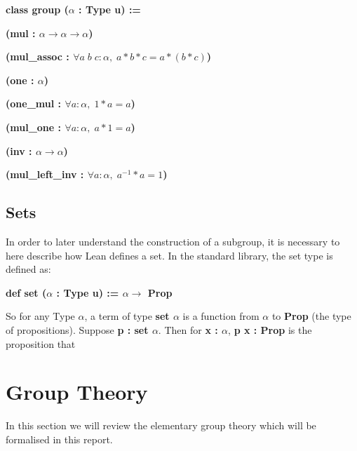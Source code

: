 \documentclass[runningheads,a4paper]{llncs}
\renewcommand{\a}{\alpha}
\renewcommand{\-}{\setminus}
\begin{document}
\vspace{2 mm}
\hspace{4 em}\textbf{class group ($\a$ : Type u) := }

\hspace{6 em}\textbf{(mul : $\a \to \a \to \a$)}

\hspace{6 em}\textbf{(mul\_assoc : $\forall a\; b\; c : \a,\; a * b * c = a * (b * c)$)}

\hspace{6 em}\textbf{(one : $\a$)}

\hspace{6 em}\textbf{(one\_mul : $\forall a : \a,\; 1 * a = a$)}

\hspace{6 em}\textbf{(mul\_one : $\forall a : \a,\; a * 1 = a$)}

\hspace{6 em}\textbf{(inv : $\a \to \a$)}

\hspace{6 em}\textbf{(mul\_left\_inv : $\forall a : \a,\; a^{-1} * a = 1$)}
\vspace{2 mm}

\subsection{Sets}

In order to later understand the construction of a subgroup, it is necessary to here describe how Lean defines a set. In the standard library, the set type is defined as:

\vspace{2 mm}
\hspace{4 em}\textbf{def set ($\a$ : Type u) := $\a \to$ Prop}
\vspace{2 mm}

So for any Type $\a$, a term of type \textbf{set $\a$} is a function from $\a$ to \textbf{Prop} (the type of propositions). Suppose \textbf{p : set $\a$}. Then for \textbf{x : $\a$}, \textbf{p x : Prop} is the proposition that 

\section{Group Theory}

In this section we will review the elementary group theory\cite{artin} which will be formalised in this report.
\end{document}
